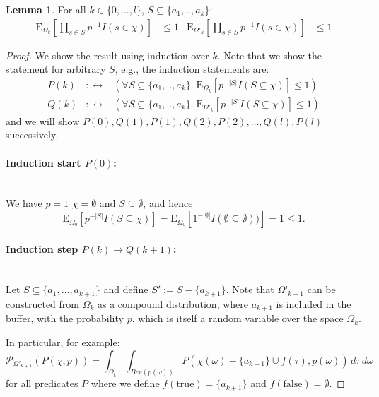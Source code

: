 \documentclass{article}
\newcommand{\prob}{\mathcal P}
\newcommand{\expectation}{\mathrm{E}}
\theoremstyle{definition}
\newtheorem{lemma}{Lemma}
\begin{document}
\begin{lemma}
\label{le:neg_cor}
For all $k \in \{0,\ldots,l\}$, $S \subseteq \{a_1,..,a_k\}$:
\begin{align*}
  \expectation_{\Omega_k}\left[ \prod_{s \in S} p^{-1} I(s \in \chi) \right] & \leq 1 &
  \expectation_{\Omega'_k}\left[ \prod_{s \in S} p^{-1} I(s \in \chi) \right] & \leq 1
\end{align*}
\end{lemma}
\begin{proof}
We show the result using induction over $k$. Note that we show the statement for arbitrary $S$, e.g., the induction statements are:
\begin{eqnarray*}
P(k) & :\leftrightarrow & \left(\forall S \subseteq \{a_1,..,a_k\}. \; \expectation_{\Omega_k}\left[p^{-|S|} I(S \subseteq \chi)\right] \leq 1\right) \\
Q(k) & :\leftrightarrow & \left(\forall S \subseteq \{a_1,..,a_k\}. \; \expectation_{\Omega'_k}\left[p^{-|S|} I(S \subseteq \chi)\right] \leq 1\right)
\end{eqnarray*}
and we will show $P(0),Q(1),P(1),Q(2),P(2),\ldots,Q(l),P(l)$ successively.
\paragraph{Induction start $P(0)$:} \phantom{.}\\
We have $p=1$ $\chi=\emptyset$ and $S \subseteq \emptyset$, and hence
\[
\expectation_{\Omega_0}\left[p^{-|S|} I(S \subseteq \chi)\right] = \expectation_{\Omega_0}\left[1^{-|\emptyset|} I(\emptyset \subseteq \emptyset))\right] = 1 \leq 1 \textrm{.}
\]
\paragraph{Induction step $P(k) \rightarrow Q(k+1)$:} \phantom{.}\\
Let $S \subseteq \{ a_1, \ldots, a_{k+1} \}$ and define $S' := S - \{ a_{k+1} \}$.
Note that $\Omega’_{k+1}$ can be constructed from $\Omega_k$ as a compound distribution, where $a_{k+1}$ is included in the buffer, with the probability $p$, which is itself a random variable over the space $\Omega_k$.

In particular, for example:
\[
\prob_{\Omega'_{k+1}}( P(\chi, p) ) = \int_{\Omega_k} \int_{Ber(p(\omega))} P(\chi(\omega)-\{a_{k+1}\}\cup f(\tau), p(\omega)) \, d \tau \, d \omega
\]
for all predicates $P$ where we define $f(\mathrm{true}) = \{a_{k+1}\}$ and $f(\mathrm{false}) = \emptyset$.


\end{proof}
\end{document}
